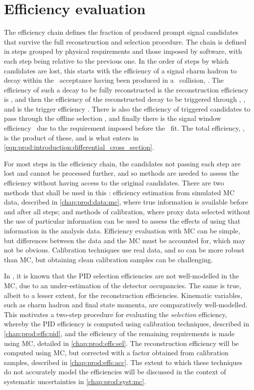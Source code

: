 \chapter{Efficiency evaluation}
\label{chap:prod:effs}

The efficiency chain defines the fraction of produced prompt signal candidates 
that survive the full reconstruction and selection procedure.
The chain is defined in steps grouped by physical requirements and those 
imposed by software, with each step being relative to the previous one.
In the order of steps by which candidates are lost, this starts with the 
efficiency of a signal charm hadron to decay within the \lhcb\ acceptance 
having been produced in a \pp\ collision, \effacc.
The efficiency of such a decay to be fully reconstructed is the reconstruction 
efficiency is \effreco, and then the efficiency of the reconstructed decay to 
be triggered through \lzero, \hltone, and \hlttwo is the trigger efficiency 
\efftrig.
There is also the efficiency of triggered candidates to pass through the 
offline selection \effoffline, and finally there is the signal window 
efficiency \effsigwin\ due to the requirement imposed before the \lnipchisq\ 
fit.
The total efficiency, \eff, is the product of these, and is what enters in 
\cref{eqn:prod:introduction:differential_cross_section}.

For most steps in the efficiency chain, the candidates not passing each step 
are lost and cannot be processed further, and so methods are needed to assess the 
efficiency without having access to the original candidates.
There are two methods that shall be used in this : 
efficiency estimation from simulated \acf{MC} data, described in 
\cref{chap:prod:data:mc}, where true information is available before and after 
all steps; and methods of calibration, where proxy data selected without the 
use of particular information can be used to assess the effects of using that information in the 
analysis data.
Efficiency evaluation with \ac{MC} can be simple, but differences between the 
data and the \ac{MC} must be accounted for, which may not be obvious.
Calibration techniques use real data, and so can be more robust than \ac{MC}, 
but obtaining clean calibration samples can be challenging.

In \lhcb, it is known that the \ac{PID} selection efficiencies are not 
well-modelled in the \ac{MC}, due to an under-estimation of the detector 
occupancies.
The same is true, albeit to a lesser extent, for the reconstruction 
efficiencies.
Kinematic variables, such as charm hadron and final state momenta, are 
comparatively well-modelled.
This motivates a two-step procedure for evaluating the \emph{selection} 
efficiency, whereby the \ac{PID} efficiency is computed using calibration 
techniques, described in \cref{chap:prod:effs:pid}, and the efficiency of the remaining 
requirements is made using \ac{MC}, detailed in \cref{chap:prod:effs:sel}.
The reconstruction efficiency will be computed using \ac{MC}, but corrected 
with a factor obtained from calibration samples, described in \cref{chap:prod:effs:acc}.
The extent to which these techniques do not accurately model the efficiencies 
will be discussed in the context of systematic uncertainties in 
\cref{chap:prod:syst:mc}.

